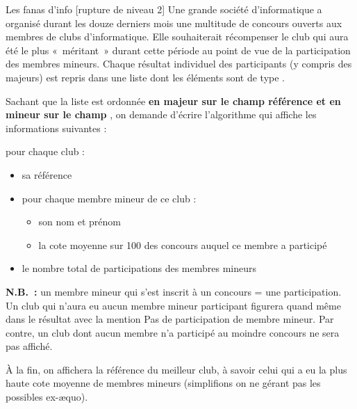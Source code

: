 \begin{Exercice}{Les fanas d'info  [rupture de niveau 2]}
	Une grande société d’informatique a organisé durant les douze derniers
	mois une multitude de concours ouverts aux membres de clubs d’informatique. 
	Elle souhaiterait récompenser le club qui aura été le plus «~méritant~» 
	durant cette période au point de vue de la participation des membres mineurs. 
	Chaque résultat individuel des participants (y compris des majeurs) est repris dans une liste
	dont les éléments sont de type .

	\begin{algo}
	\end{algo}

	Sachant que la liste est ordonnée \textbf{en majeur sur le champ \textsf{référence}
	et en mineur sur le champ }, 
	on demande d’écrire l’algorithme qui affiche les informations suivantes :

	pour chaque club :
	\begin{itemize}
		\item 
			sa référence
		\item 
			pour chaque membre mineur de ce club :
        \begin{itemize}
		    \item 
			   son nom et prénom
		    \item 
			   la cote moyenne sur 100 des concours auquel ce membre a participé
        \end{itemize}
		\item 
			le nombre total de participations des membres mineurs
	\end{itemize}
	
	\textbf{N.B.~:} un membre mineur qui s’est inscrit à un concours = une
	participation. Un club qui n’aura eu aucun membre mineur participant
	figurera quand même dans le résultat avec la mention 
	\og{}Pas de participation de membre mineur\fg{}. 
	Par contre, un club dont aucun membre n’a participé au moindre concours ne sera pas affiché.

	À la fin, on affichera la référence du meilleur club, à savoir celui qui
	a eu la plus haute cote moyenne de membres mineurs 
	(simplifions on ne gérant pas les possibles ex-\ae{}quo).

\end{Exercice}

